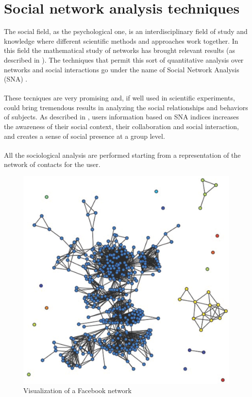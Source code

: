 \section{Social network analysis techniques}
The social ﬁeld, as the psychological one, is an interdisciplinary ﬁeld of study and knowledge where different scientiﬁc methods and approaches work together.
In this ﬁeld the mathematical study of networks has brought relevant results (as described in \cite{Wassermann-1994}).
The techniques that permit this sort of quantitative analysis over networks and social interactions go under the name of Social Network Analysis (SNA) \cite{Butts-2005}.\\
\\
These tecniques are very promising and, if well used in scientiﬁc experiments, could bring tremendous results in analyzing the social relationships and behaviors
of subjects.
As described in \cite{Martino-2007}, users information based on SNA indices increases the awareness of their social context, their collaboration and social interaction,
and creates a sense of social presence at a group level.\\
\\
All the sociological analysis are performed starting from a representation of the network of contacts for the user.

\begin{figure}[h]
\centering
\includegraphics[width=\columnwidth]{Fig1fbnetwork.eps}
\caption{Visualization of a Facebook network}
\label{fig:FBNetwork}
\end{figure}

